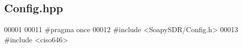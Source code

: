 \subsection{Config.\+hpp}
\label{Config_8hpp_source}

\begin{DoxyCode}
00001 
00011 \textcolor{preprocessor}{#pragma once}
00012 \textcolor{preprocessor}{#include <SoapySDR/Config.h>}
00013 \textcolor{preprocessor}{#include <ciso646>}
\end{DoxyCode}
